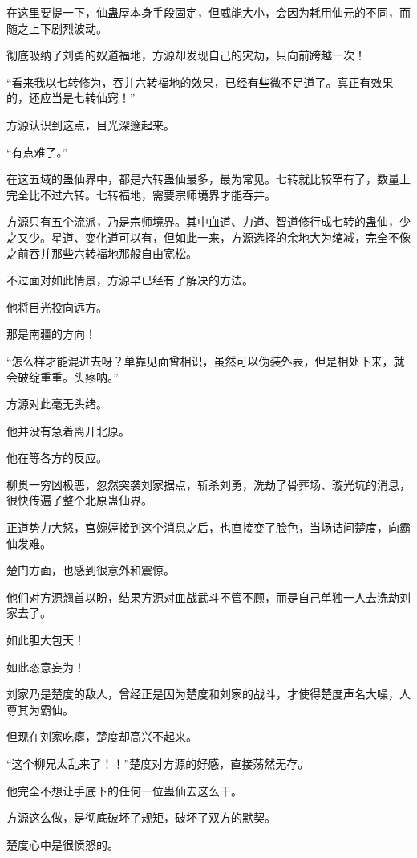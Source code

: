 \begin{this_body}
在这里要提一下，仙蛊屋本身手段固定，但威能大小，会因为耗用仙元的不同，而随之上下剧烈波动。

彻底吸纳了刘勇的奴道福地，方源却发现自己的灾劫，只向前跨越一次！

“看来我以七转修为，吞并六转福地的效果，已经有些微不足道了。真正有效果的，还应当是七转仙窍！”

方源认识到这点，目光深邃起来。

“有点难了。”

在这五域的蛊仙界中，都是六转蛊仙最多，最为常见。七转就比较罕有了，数量上完全比不过六转。七转福地，需要宗师境界才能吞并。

方源只有五个流派，乃是宗师境界。其中血道、力道、智道修行成七转的蛊仙，少之又少。星道、变化道可以有，但如此一来，方源选择的余地大为缩减，完全不像之前吞并那些六转福地那般自由宽松。

不过面对如此情景，方源早已经有了解决的方法。

他将目光投向远方。

那是南疆的方向！

“怎么样才能混进去呀？单靠见面曾相识，虽然可以伪装外表，但是相处下来，就会破绽重重。头疼呐。”

方源对此毫无头绪。

他并没有急着离开北原。

他在等各方的反应。

柳贯一穷凶极恶，忽然突袭刘家据点，斩杀刘勇，洗劫了骨葬场、璇光坑的消息，很快传遍了整个北原蛊仙界。

正道势力大怒，宫婉婷接到这个消息之后，也直接变了脸色，当场诘问楚度，向霸仙发难。

楚门方面，也感到很意外和震惊。

他们对方源翘首以盼，结果方源对血战武斗不管不顾，而是自己单独一人去洗劫刘家去了。

如此胆大包天！

如此恣意妄为！

刘家乃是楚度的敌人，曾经正是因为楚度和刘家的战斗，才使得楚度声名大噪，人尊其为霸仙。

但现在刘家吃瘪，楚度却高兴不起来。

“这个柳兄太乱来了！！”楚度对方源的好感，直接荡然无存。

他完全不想让手底下的任何一位蛊仙去这么干。

方源这么做，是彻底破坏了规矩，破坏了双方的默契。

楚度心中是很愤怒的。


\end{this_body}
